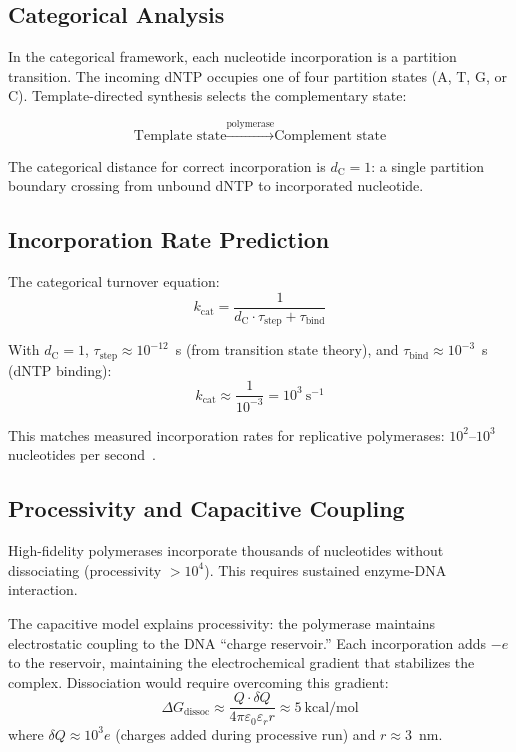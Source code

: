 \documentclass[twocolumn,aps,prb,superscriptaddress,longbibliography,floatfix]{revtex4-2}
\theoremstyle{remark}
\newcommand{\dC}{d_\text{C}}
\begin{document}
\subsection{Categorical Analysis}

In the categorical framework, each nucleotide incorporation is a
partition transition. The incoming dNTP occupies one of four partition
states (A, T, G, or C). Template-directed synthesis selects the
complementary state:

\begin{equation}
\text{Template state} \xrightarrow{\text{polymerase}} \text{Complement state}
\end{equation}

The categorical distance for correct incorporation is $\dC = 1$: a
single partition boundary crossing from unbound dNTP to incorporated
nucleotide.

\subsection{Incorporation Rate Prediction}

The categorical turnover equation:
\begin{equation}
k_\text{cat} = \frac{1}{\dC \cdot \tau_\text{step} + \tau_\text{bind}}
\label{eq:polymerase_rate}
\end{equation}

With $\dC = 1$, $\tau_\text{step} \approx 10^{-12}$~s (from transition
state theory), and $\tau_\text{bind} \approx 10^{-3}$~s (dNTP binding):
\begin{equation}
k_\text{cat} \approx \frac{1}{10^{-3}} = 10^3~\text{s}^{-1}
\end{equation}

This matches measured incorporation rates for replicative polymerases:
$10^2$--$10^3$ nucleotides per second~\cite{Johnson2010}.

\subsection{Processivity and Capacitive Coupling}

High-fidelity polymerases incorporate thousands of nucleotides without
dissociating (processivity $>10^4$). This requires sustained
enzyme-DNA interaction.

The capacitive model explains processivity: the polymerase maintains
electrostatic coupling to the DNA ``charge reservoir.'' Each
incorporation adds $-e$ to the reservoir, maintaining the
electrochemical gradient that stabilizes the complex. Dissociation
would require overcoming this gradient:
\begin{equation}
\Delta G_\text{dissoc} \approx \frac{Q \cdot \delta Q}{4\pi\varepsilon_0\varepsilon_r r} \approx 5~\text{kcal/mol}
\end{equation}
where $\delta Q \approx 10^3 e$ (charges added during processive run)
and $r \approx 3$~nm.
\end{document}
